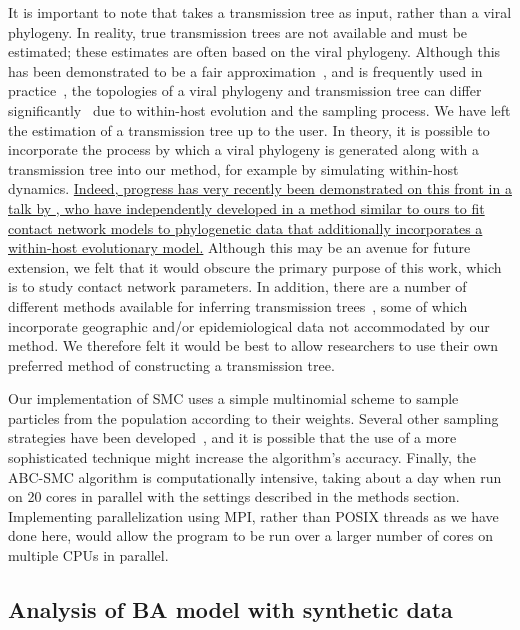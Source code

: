 It is important to note that  takes a transmission tree as
input, rather than a viral phylogeny. In reality, true transmission trees are
not available and must be estimated; these estimates are often based on the
viral phylogeny. Although this has been demonstrated to be a fair
approximation~\autocite[e.g.][]{leitner1996accurate}, and is frequently used in
practice~\autocite[e.g.][]{stadler2013uncovering}, the topologies of a viral
phylogeny and transmission tree can differ
significantly~\autocite{ypma2013relating, hall2015epidemic} due to within-host
evolution and the sampling process. We have left the estimation of a
transmission tree up to the user. In theory, it is possible to incorporate the
process by which a viral phylogeny is generated along with a transmission tree
into our method, for example by simulating within-host dynamics. {\color{blue}
\uline{Indeed, progress has very recently been demonstrated on this front in a
talk by \citeauthor{giardina2016inference}, who have independently developed in
a method similar to ours to fit contact network models to phylogenetic data
that additionally incorporates a within-host evolutionary model.}} Although
this may be an avenue for future extension, we felt that it would obscure the
primary purpose of this work, which is to study contact network parameters. In
addition, there are a number of different methods available for inferring
transmission trees~\autocite{didelot2014bayesian, ypma2012unravelling,
jombart2011reconstructing, cottam2008integrating, hall2015epidemic}, some of
which incorporate geographic and/or epidemiological data not accommodated by
our method. We therefore felt it would be best to allow researchers to use
their own preferred method of constructing a transmission tree.

Our implementation of \gls{SMC} uses a simple multinomial scheme to sample
particles from the population according to their weights. Several other
sampling strategies have been developed~\autocite{douc2005comparison}, and it
is possible that the use of a more sophisticated technique might increase the
algorithm's accuracy. Finally, the \gls{ABC}-\gls{SMC} algorithm is
computationally intensive, taking about a day when run on 20 cores in parallel
with the settings described in the methods section. Implementing
parallelization using \gls{MPI}, rather than \gls{POSIX} threads as we have
done here, would allow the program to be run over a larger number of cores on
multiple CPUs in parallel.

\subsection{Analysis of \acrlong{BA} model with synthetic data}

